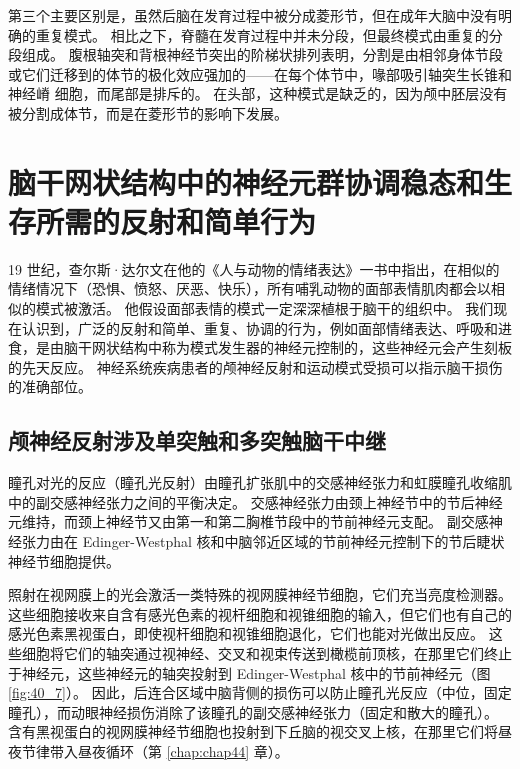 第三个主要区别是，虽然后脑在发育过程中被分成菱形节，但在成年大脑中没有明确的重复模式。 相比之下，脊髓在发育过程中并未分段，但最终模式由重复的分段组成。 腹根轴突和背根神经节突出的阶梯状排列表明，分割是由相邻身体节段或它们迁移到的体节的极化效应强加的——在每个体节中，喙部吸引轴突生长锥和神经嵴 细胞，而尾部是排斥的。 在头部，这种模式是缺乏的，因为颅中胚层没有被分割成体节，而是在菱形节的影响下发展。


\section{脑干网状结构中的神经元群协调稳态和生存所需的反射和简单行为}
19 世纪，查尔斯·达尔文在他的《人与动物的情绪表达》一书中指出，在相似的情绪情况下（恐惧、愤怒、厌恶、快乐），所有哺乳动物的面部表情肌肉都会以相似的模式被激活。 他假设面部表情的模式一定深深植根于脑干的组织中。 我们现在认识到，广泛的反射和简单、重复、协调的行为，例如面部情绪表达、呼吸和进食，是由脑干网状结构中称为模式发生器的神经元控制的，这些神经元会产生刻板的先天反应。 神经系统疾病患者的颅神经反射和运动模式受损可以指示脑干损伤的准确部位。

\subsection{颅神经反射涉及单突触和多突触脑干中继}
瞳孔对光的反应（瞳孔光反射）由瞳孔扩张肌中的交感神经张力和虹膜瞳孔收缩肌中的副交感神经张力之间的平衡决定。 交感神经张力由颈上神经节中的节后神经元维持，而颈上神经节又由第一和第二胸椎节段中的节前神经元支配。 副交感神经张力由在 Edinger-Westphal 核和中脑邻近区域的节前神经元控制下的节后睫状神经节细胞提供。

照射在视网膜上的光会激活一类特殊的视网膜神经节细胞，它们充当亮度检测器。 这些细胞接收来自含有感光色素的视杆细胞和视锥细胞的输入，但它们也有自己的感光色素黑视蛋白，即使视杆细胞和视锥细胞退化，它们也能对光做出反应。 
这些细胞将它们的轴突通过视神经、交叉和视束传送到橄榄前顶核，在那里它们终止于神经元，这些神经元的轴突投射到 Edinger-Westphal 核中的节前神经元（图 \ref{fig:40_7}）。 
因此，后连合区域中脑背侧的损伤可以防止瞳孔光反应（中位，固定瞳孔），而动眼神经损伤消除了该瞳孔的副交感神经张力（固定和散大的瞳孔）。 含有黑视蛋白的视网膜神经节细胞也投射到下丘脑的视交叉上核，在那里它们将昼夜节律带入昼夜循环（第 \ref{chap:chap44} 章）。

